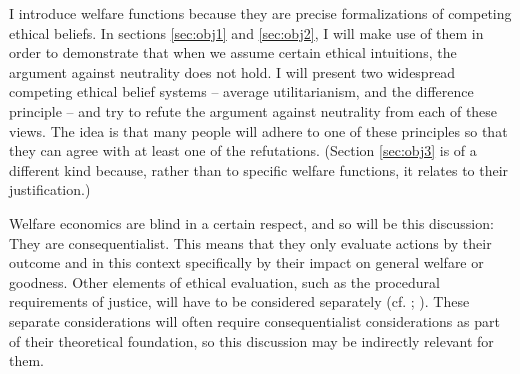 I introduce welfare functions because they are precise formalizations of competing ethical beliefs. In sections \ref{sec:obj1} and \ref{sec:obj2}, I will make use of them in order to demonstrate that when we assume certain ethical intuitions, the argument against neutrality does not hold. I will present two widespread competing ethical belief systems – average utilitarianism, and the difference principle – and try to refute the argument against neutrality from each of these views. The idea is that many people will adhere to one of these principles so that they can agree with at least one of the refutations. (Section \ref{sec:obj3} is of a different kind because, rather than to specific welfare functions, it relates to their justification.)

Welfare economics are blind in a certain respect, and so will be this discussion: They are consequentialist. This means that they only evaluate actions by their outcome and in this context specifically by their impact on general welfare or goodness. Other elements of ethical evaluation, such as the procedural requirements of justice, will have to be considered separately (cf. ; ). These separate considerations will often require consequentialist considerations as part of their theoretical foundation, so this discussion may be indirectly relevant for them. 